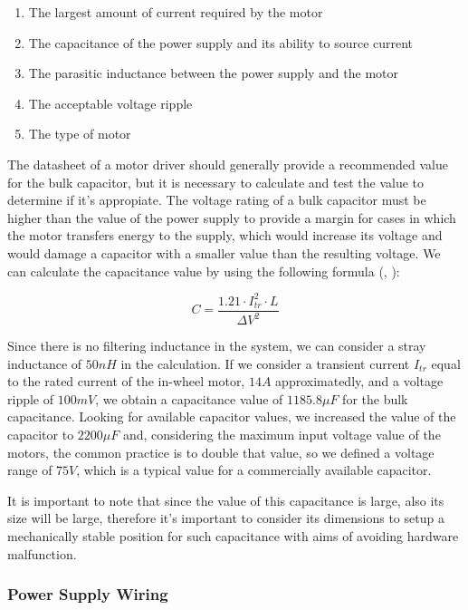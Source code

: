 \begin {enumerate}
	\item The largest amount of current required by the motor
	\item The capacitance of the power supply and its ability to source current
	\item The parasitic inductance between the power supply and the motor
	\item The acceptable voltage ripple
	\item The type of motor
\end {enumerate}

The datasheet of a motor driver should generally provide a recommended value for the bulk capacitor, but it is necessary to calculate and test the value to determine if it's appropiate. The voltage rating of a bulk capacitor must be higher than the value of the power supply to provide a margin for cases in which the motor transfers energy to the supply, which would increase its voltage and would damage a capacitor with a smaller value than the resulting voltage. We can calculate the capacitance value by using the following formula (\citeauthor{bulkCap}, \citeyear{bulkCap}):

\begin{equation} \label{current_ripple_2}
	C = \frac{1.21 \cdot I_{tr}^{2} \cdot L}{\Delta V^{2}}
\end{equation}

Since there is no filtering inductance in the system, we can consider a stray inductance of $50 nH$ in the calculation. If we consider a transient current $I_{tr}$ equal to the rated current of the in-wheel motor, $14 A$ approximatedly, and a voltage ripple of $100 mV$, we obtain a capacitance value of $1185.8\mu F$ for the bulk capacitance. Looking for available capacitor values, we increased the value of the capacitor to $2200\mu F$ and, considering the maximum input voltage value of the motors, the common practice is to double that value, so we defined a voltage range of $75V$, which is a typical value for a commercially available capacitor.

It is important to note that since the value of this capacitance is large, also its size will be large, therefore it's important to consider its dimensions to setup a mechanically stable position for such capacitance with aims of avoiding hardware malfunction.

\subsubsection{Power Supply Wiring}

